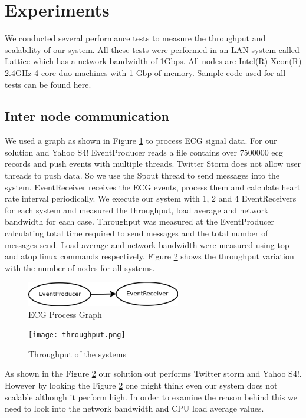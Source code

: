 \section{Experiments}

We conducted several performance tests to measure the throughput and scalability of our system. All these tests were performed in an LAN system called Lattice which has a network bandwidth of 1Gbps. All nodes are Intel(R) Xeon(R) 2.4GHz 4 core duo machines with 1 Gbp of memory. Sample code used for all tests can be found here.

\subsection{Inter node communication}
We used a graph as shown in Figure \ref{ecgGraph} to process ECG signal data. For our solution and Yahoo S4! EventProducer reads a file contains over 7500000 ecg records and push events with multiple threads. Twitter Storm does not allow user threads to push data. So we use the Spout thread to send messages into the system. EventReceiver  receives the ECG events, process them and calculate heart rate interval periodically.  
We execute our system with 1, 2 and 4  EventReceivers for each system and measured the throughput, load average and network bandwidth  for each case. Throughput was measured at the EventProducer calculating total time required to send messages and the total number of messages send. Load average and network bandwidth were measured using top and atop linux commands respectively. Figure \ref{throuput} shows the throughput variation with the number of nodes for all systems. 

\begin{figure}
        \centering
        \includegraphics[width=0.6\textwidth]{ecgGraph.png}
        \caption{ECG Process Graph}
        \label{ecgGraph}
\end{figure}
\begin{figure}
        \centering
        \texttt{[image: throughput.png]}
        \caption{Throughput of the systems}
        \label{throuput}
\end{figure}

As shown in the Figure \ref{throuput} our solution out performs Twitter storm and Yahoo S4!. However by looking the Figure \ref{throuput} one might think even our system does not scalable although it perform high. In order to examine the reason behind this we need to look into the network bandwidth and CPU load average values. 
 

